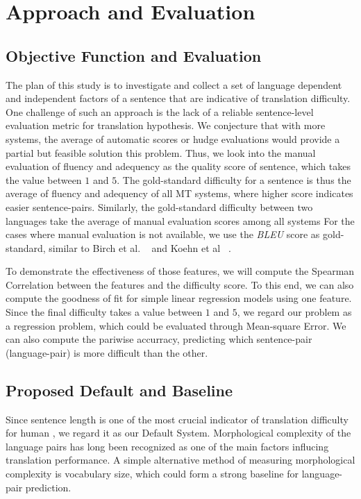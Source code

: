 \documentclass[11pt]{article}
\begin{document}
\section{Approach and Evaluation}
\subsection{Objective Function and Evaluation}
The plan of this study is to investigate and collect a set of language dependent and independent factors of a sentence that are indicative of translation difficulty. 
One challenge of such an approach is the lack of a reliable sentence-level evaluation metric for translation hypothesis. 
We conjecture that with more systems, the average of automatic scores or hudge evaluations would provide a partial but feasible solution this problem.
Thus, we look into the manual evaluation of fluency and adequency as the quality score of sentence, which takes the value between $1$ and $5$. 
The gold-standard difficulty for a sentence is thus the average of fluency and adequency of all MT systems, where higher score indicates easier sentence-pairs.
Similarly, the gold-standard difficulty between two languages take the average of manual evaluation scores among all systems
For the cases where manual evaluation is not available, we use the \emph{BLEU} score as gold-standard, similar to Birch et al. ~ and Koehn et al ~.

To demonstrate the effectiveness of those features, we will compute the Spearman Correlation between the features and the difficulty score.
To this end, we can also compute the goodness of fit for simple linear regression models using one feature. 
Since the final difficulty takes a value between $1$ and $5$, we regard our problem as a regression problem, which could be evaluated through Mean-square Error.
We can also compute the pariwise accurracy, predicting which sentence-pair (language-pair) is more difficult than the other. 

\subsection{Proposed Default and Baseline}
Since sentence length is one of the most crucial indicator of translation difficulty for human \cite{mishra-bhattacharyya-carl:2013:Short}, we regard it as our Default System.
Morphological complexity of the language pairs has long been recognized as one of the main factors influcing translation performance.
A simple alternative method of measuring morphological complexity is vocabulary size, which could form a strong baseline for language-pair prediction.



\end{document}

